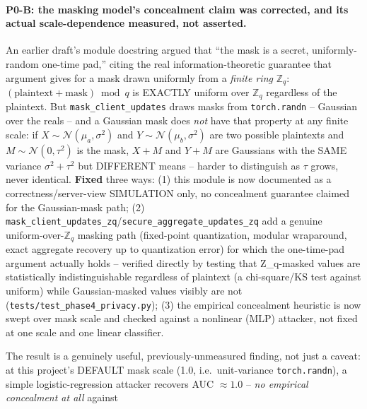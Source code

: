 \documentclass[11pt]{article}
\begin{document}
\paragraph{P0-B: the masking model's concealment claim was corrected, and
its actual scale-dependence measured, not asserted.} An earlier draft's
module docstring argued that ``the mask is a secret, uniformly-random
one-time pad,'' citing the real information-theoretic guarantee that
argument gives for a mask drawn uniformly from a \emph{finite ring}
$\mathbb{Z}_q$: $(\text{plaintext}+\text{mask}) \bmod q$ is EXACTLY
uniform over $\mathbb{Z}_q$ regardless of the plaintext. But
\texttt{mask\_client\_updates} draws masks from \texttt{torch.randn} --
Gaussian over the reals -- and a Gaussian mask does \emph{not} have that
property at any finite scale: if $X\!\sim\!\mathcal N(\mu_a,\sigma^2)$ and
$Y\!\sim\!\mathcal N(\mu_b,\sigma^2)$ are two possible plaintexts and
$M\!\sim\!\mathcal N(0,\tau^2)$ is the mask, $X\!+\!M$ and $Y\!+\!M$ are
Gaussians with the SAME variance $\sigma^2\!+\!\tau^2$ but DIFFERENT means
-- harder to distinguish as $\tau$ grows, never identical. \textbf{Fixed}
three ways: (1) this module is now documented as a correctness/server-view
SIMULATION only, no concealment guarantee claimed for the Gaussian-mask
path; (2) \texttt{mask\_client\_updates\_zq}/\texttt{secure\_aggregate\_updates\_zq}
add a genuine uniform-over-$\mathbb{Z}_q$ masking path (fixed-point
quantization, modular wraparound, exact aggregate recovery up to
quantization error) for which the one-time-pad argument actually holds --
verified directly by testing that Z\_q-masked values are statistically
indistinguishable regardless of plaintext (a chi-square/KS test against
uniform) while Gaussian-masked values visibly are not
(\texttt{tests/test\_phase4\_privacy.py}); (3) the empirical concealment
heuristic is now swept over mask scale and checked against a nonlinear
(MLP) attacker, not fixed at one scale and one linear classifier.

\label{tab:phase4-concealment}
The result is a genuinely useful, previously-unmeasured finding, not just
a caveat: at this project's DEFAULT mask scale (1.0, i.e.\ unit-variance
\texttt{torch.randn}), a simple logistic-regression attacker recovers
AUC $\approx 1.0$ -- \emph{no empirical concealment at all} against
\end{document}
